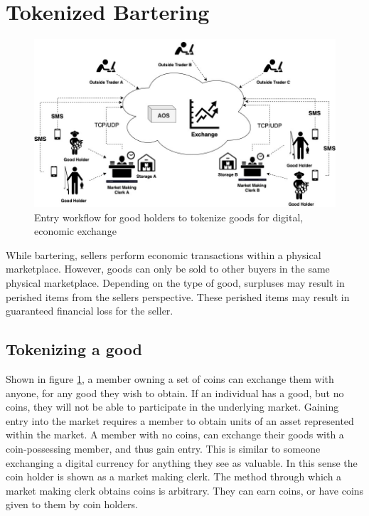 \documentclass[10pt, titlepage, twocolumn]{report}
\begin{document}
\section{Tokenized Bartering}

\begin{figure}[ht]
\centering
	\includegraphics[width=\textwidth]{bartering}
	\caption{Entry workflow for good holders to tokenize goods for digital, economic exchange}
	\label{bartering}
\end{figure}

\hspace*{15pt}
While bartering, sellers perform economic transactions within a physical marketplace. However, goods can only be sold to other buyers in the same physical marketplace. Depending on the type of good, surpluses may result in perished items from the sellers perspective. These perished items may result in guaranteed financial loss for the seller.

\subsection{Tokenizing a good}
\hspace*{15pt} 
Shown in figure \ref{bartering}, a member owning a set of coins can exchange them with anyone, for any good they wish to obtain. If an individual has a good, but no coins, they will not be able to participate in the underlying market. Gaining entry into the market requires a member to obtain units of an asset represented within the market. A member with no coins, can exchange their goods with a coin-possessing member, and thus gain entry. This is similar to someone exchanging a digital currency for anything they see as valuable. In this sense the coin holder is shown as a market making clerk. The method through which a market making clerk obtains coins is arbitrary. They can earn coins, or have coins given to them by coin holders.
\end{document}
